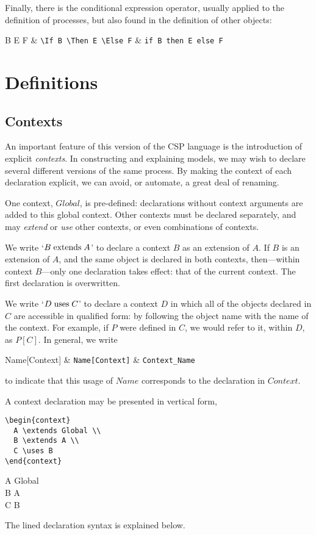 \documentclass[fleqn,a4paper]{article}
\def\gives{\endquote\endgroup\egroup}
\begin{document}
Finally, there is the conditional expression operator, usually applied
to the definition of processes, but also found in the definition of
other objects:
\begin{demotable}
  \If B \Then E \Else F & \verb=\If B \Then E \Else F=
  & \verb=if B then E else F=
\end{demotable}

\section{Definitions}

\subsection{Contexts}

An important feature of this version of the CSP language is the
introduction of explicit \emph{contexts}.  In constructing and
explaining models, we may wish to declare several different versions
of the same process.  By making the context of each declaration
explicit, we can avoid, or automate, a great deal of renaming.

One context, $Global$, is pre-defined: declarations without context
arguments are added to this global context.  Other contexts must be
declared separately, and may \emph{extend} or \emph{use} other
contexts, or even combinations of contexts.

We write `$B \mathrel{\mathrm{extends}} A$' to declare a context $B$ as an extension of
$A$.  If $B$ is an extension of $A$, and the same object is declared
in both contexts, then---within context $B$---only one declaration
takes effect: that of the current context.  The first declaration is
overwritten.

We write `$D \mathrel{\mathrm{uses}} C$' to declare a context $D$ in which all of the
objects declared in $C$ are accessible in qualified form: by following
the object name with the name of the context.  For example, if $P$
were defined in $C$, we would refer to it, within $D$, as $P[C]$.  In
general, we write 
\begin{demotable}
  Name[Context] & \verb=Name[Context]= & \verb=Context_Name=
\end{demotable}
to indicate that this usage of $Name$ corresponds to the declaration
in $Context$.

A context declaration may be presented in vertical form, 
\begin{demo}
\begin{verbatim}
\begin{context}
  A \extends Global \\
  B \extends A \\
  C \uses B
\end{context}
\end{verbatim}
\gives
\begin{context}
  A \extends Global \\
  B \extends A \\
  C \uses B
\end{context}
\end{demo}
The lined declaration syntax is explained below. 
\end{document}
